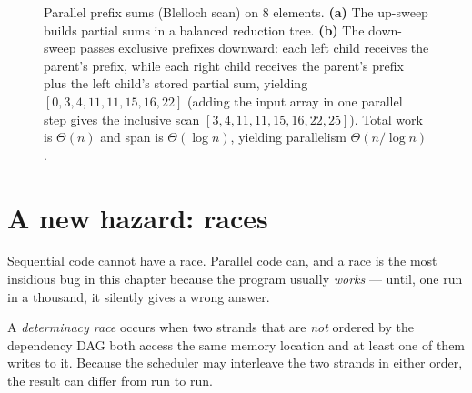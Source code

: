 \begin{figure}[h]
\caption{Parallel prefix sums (Blelloch scan) on $8$ elements. \textbf{(a)} The
up-sweep builds partial sums in a balanced reduction tree. \textbf{(b)} The
down-sweep passes exclusive prefixes downward: each left child receives the parent's
prefix, while each right child receives the parent's prefix plus the left child's
stored partial sum, yielding $[0,3,4,11,11,15,16,22]$ (adding the input array in
one parallel step gives the inclusive scan $[3,4,11,11,15,16,22,25]$). Total work
is $\Theta(n)$ and span is $\Theta(\log n)$, yielding parallelism $\Theta(n / \log n)$.}
\label{ch35:fig-prefix-scan}
\end{figure}

\section{A new hazard: races}

Sequential code cannot have a race. Parallel code can, and a race is the most
insidious bug in this chapter because the program usually \emph{works} --- until,
one run in a thousand, it silently gives a wrong answer.

\begin{definition}\label{ch35:def-race}
A \emph{determinacy race} occurs when two strands that are \emph{not} ordered by
the dependency DAG both access the same memory location and at least one of them
writes to it. Because the scheduler may interleave the two strands in either
order, the result can differ from run to run.
\end{definition}

